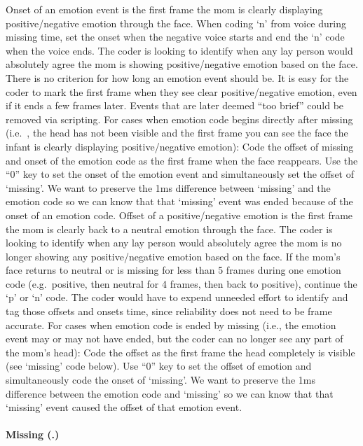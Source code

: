 \documentclass[
  12pt,
]{book}
\begin{document}
Onset of an emotion event is the first frame the mom is clearly displaying positive/negative emotion through the face. When coding `n' from voice during missing time, set the onset when the negative voice starts and end the `n' code when the voice ends. The coder is looking to identify when any lay person would absolutely agree the mom is showing positive/negative emotion based on the face.
There is no criterion for how long an emotion event should be. It is easy for the coder to mark the first frame when they see clear positive/negative emotion, even if it ends a few frames later. Events that are later deemed ``too brief'' could be removed via scripting.
For cases when emotion code begins directly after missing (i.e.~, the head has not been visible and the first frame you can see the face the infant is clearly displaying positive/negative emotion): Code the offset of missing and onset of the emotion code as the first frame when the face reappears. Use the ``0'' key to set the onset of the emotion event and simultaneously set the offset of `missing'. We want to preserve the 1ms difference between `missing' and the emotion code so we can know that that `missing' event was ended because of the onset of an emotion code.
Offset of a positive/negative emotion is the first frame the mom is clearly back to a neutral emotion through the face. The coder is looking to identify when any lay person would absolutely agree the mom is no longer showing any positive/negative emotion based on the face.
If the mom's face returns to neutral or is missing for less than 5 frames during one emotion code (e.g.~positive, then neutral for 4 frames, then back to positive), continue the `p' or `n' code. The coder would have to expend unneeded effort to identify and tag those offsets and onsets time, since reliability does not need to be frame accurate.
For cases when emotion code is ended by missing (i.e., the emotion event may or may not have ended, but the coder can no longer see any part of the mom's head): Code the offset as the first frame the head completely is visible (see `missing' code below). Use ``0'' key to set the offset of emotion and simultaneously code the onset of `missing'. We want to preserve the 1ms difference between the emotion code and `missing' so we can know that that `missing' event caused the offset of that emotion event.

\hypertarget{mom_head_not_visible}{%
\paragraph{Missing (.)}\label{mom_head_not_visible}}
\end{document}
